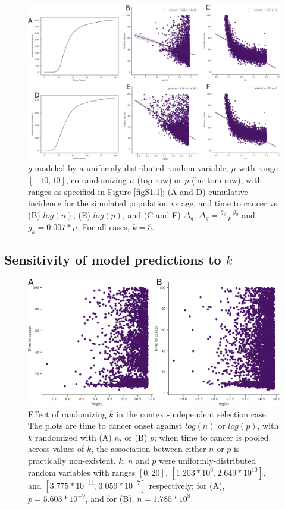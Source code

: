 \documentclass[10pt,twocolumn,twoside]{article}
\begin{document}
		\begin{figure}[tbhp]
			\centering
			\includegraphics[width=\linewidth, keepaspectratio=true]{figS1-2.png}
			\caption{$g$ modeled by a uniformly-distributed random variable, $\mu$ with range $[-10, 10]$, co-randomizing $n$ (top row) or $p$ (bottom row), with ranges as specified in Figure \ref{figS1.1}; (A and D) cumulative incidence for the simulated population vs age, and time to cancer vs (B) $log(n)$, (E) $log(p)$, and (C and F) $\Delta_{g}$; $\Delta_{g} = \frac{g_{k}-g_{0}}{k}$ and $g_{k} = 0.007*\mu$. For all cases, $k=5$.}
			\label{figS1.2}
		\end{figure}

	\subsection{Sensitivity of model predictions to $k$}\label{S2 Text}
		\renewcommand{\thefigure}{S2.\arabic{figure}}
		\setcounter{figure}{0}
		\begin{figure}[tbhp]
			\centering
			\includegraphics[width=\linewidth, keepaspectratio=true]{figS2-1.png}
			\caption{Effect of randomizing $k$ in the context-independent selection case. The plots are time to cancer onset against $log(n)$ or $log(p)$, with $k$ randomized with (A) $n$, or (B) $p$; when time to cancer is pooled across values of $k$, the association between either $n$ or $p$ is practically non-existent. $k$, $n$ and $p$ were uniformly-distributed random variables with ranges $[0, 20]$, $[1.203*10^{6}, 2.649*10^{10}]$, and $[3.775*10^{-11}, 3.059*10^{-7}]$ respectively; for (A), $p=5.603*10^{-9}$, and for (B), $n=1.785*10^{8}$.}
			\label{figS2.1}
		\end{figure}
\end{document}
